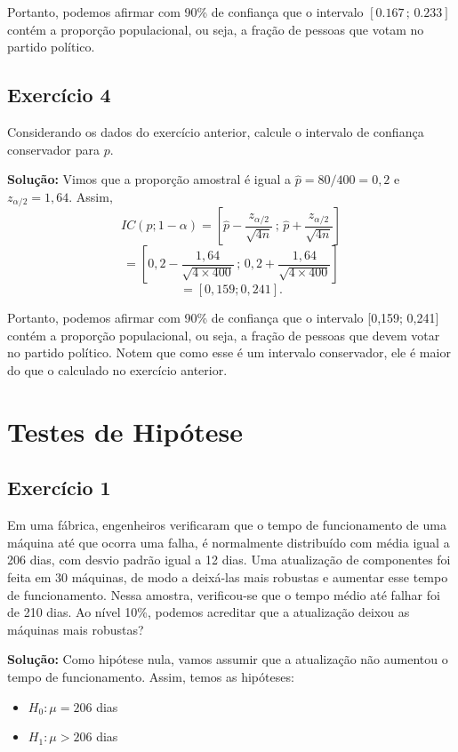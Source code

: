 \documentclass{article}
\begin{document}
Portanto, podemos afirmar com 90\% de confiança que o intervalo $[0.167 \, ; \, 0.233]$ contém a proporção populacional, ou seja, a fração de pessoas que votam no partido político.

\subsection{Exercício 4}
Considerando os dados do exercício anterior, calcule o intervalo de confiança conservador para $p$.

\vspace{0.5cm}
\textbf{Solução:}
Vimos que a proporção amostral é igual a $\hat{p} = 80/400 = 0,2$ e  
$z_{\alpha/2} = 1,64$. Assim,
    $$
    IC(p; 1-\alpha) = 
    \left[
    \hat{p} - \frac{z_{\alpha/2}}{\sqrt{4n}} \, ; \,
    \hat{p} + \frac{z_{\alpha/2}}{\sqrt{4n}}
    \right]
    $$
    $$
    = 
    \left[
    0,2 - \frac{1,64}{\sqrt{4 \times 400}} \, ; \,
    0,2 + \frac{1,64}{\sqrt{4 \times 400}}
    \right]
    $$
    $$
    = [0,159; 0,241].
    $$

Portanto, podemos afirmar com 90\% de confiança que o intervalo [0,159; 0,241] contém a proporção populacional, ou seja, a fração de pessoas que devem votar no partido político. Notem que como esse é um intervalo conservador, ele é maior do que o calculado no exercício anterior.

\section{Testes de Hipótese}
\subsection{Exercício 1}
Em uma fábrica, engenheiros verificaram que o tempo de funcionamento de uma máquina até que ocorra uma falha, é normalmente distribuído com média igual a 206 dias, com desvio padrão igual a 12 dias. Uma atualização de componentes foi feita em 30 máquinas, de modo a deixá-las mais robustas e aumentar esse tempo de funcionamento. Nessa amostra, verificou-se que o tempo médio até falhar foi de 210 dias. Ao nível 10\%, podemos acreditar que a atualização deixou as máquinas mais robustas?

\vspace{0.5cm}
\textbf{Solução:}
Como hipótese nula, vamos assumir que a atualização não aumentou o tempo de funcionamento. Assim, temos as hipóteses:
\begin{itemize}
    \item $H_0: \mu = 206$ dias
    \item $H_1: \mu > 206$ dias
\end{itemize}
\end{document}
